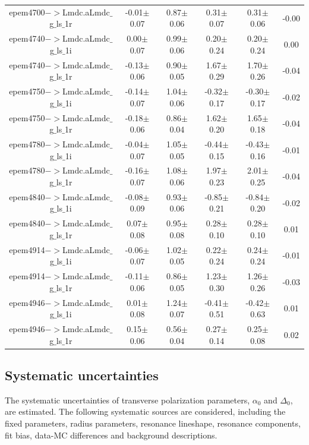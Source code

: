 \begin{table}[h]
{\begin{tabular}{cccccc}
        epem4700$->$Lmdc.aLmdc$\_$g$\_$ls$\_$1r & -0.01$\pm$0.07 & 0.87$\pm$0.06 & 0.31$\pm$0.07 & 0.31$\pm$0.06 & -0.00 \\
        epem4740$->$Lmdc.aLmdc$\_$g$\_$ls$\_$1i & 0.00$\pm$0.07 & 0.99$\pm$0.06 & 0.20$\pm$0.24 & 0.20$\pm$0.24 & 0.00 \\
        epem4740$->$Lmdc.aLmdc$\_$g$\_$ls$\_$1r & -0.13$\pm$0.06 & 0.90$\pm$0.05 & 1.67$\pm$0.29 & 1.70$\pm$0.26 & -0.04 \\
        epem4750$->$Lmdc.aLmdc$\_$g$\_$ls$\_$1i & -0.14$\pm$0.07 & 1.04$\pm$0.06 & -0.32$\pm$0.17 & -0.30$\pm$0.17 & -0.02 \\
        epem4750$->$Lmdc.aLmdc$\_$g$\_$ls$\_$1r & -0.18$\pm$0.06 & 0.86$\pm$0.04 & 1.62$\pm$0.20 & 1.65$\pm$0.18 & -0.04 \\
        epem4780$->$Lmdc.aLmdc$\_$g$\_$ls$\_$1i & -0.04$\pm$0.07 & 1.05$\pm$0.05 & -0.44$\pm$0.15 & -0.43$\pm$0.16 & -0.01 \\
        epem4780$->$Lmdc.aLmdc$\_$g$\_$ls$\_$1r & -0.16$\pm$0.07 & 1.08$\pm$0.06 & 1.97$\pm$0.23 & 2.01$\pm$0.25 & -0.04 \\
        epem4840$->$Lmdc.aLmdc$\_$g$\_$ls$\_$1i & -0.08$\pm$0.09 & 0.93$\pm$0.06 & -0.85$\pm$0.21 & -0.84$\pm$0.20 & -0.02 \\
        epem4840$->$Lmdc.aLmdc$\_$g$\_$ls$\_$1r & 0.07$\pm$0.08 & 0.95$\pm$0.08 & 0.28$\pm$0.10 & 0.28$\pm$0.10 & 0.01 \\
        epem4914$->$Lmdc.aLmdc$\_$g$\_$ls$\_$1i & -0.06$\pm$0.07 & 1.02$\pm$0.05 & 0.22$\pm$0.24 & 0.24$\pm$0.24 & -0.01 \\
        epem4914$->$Lmdc.aLmdc$\_$g$\_$ls$\_$1r & -0.11$\pm$0.06 & 0.86$\pm$0.05 & 1.23$\pm$0.30 & 1.26$\pm$0.26 & -0.03 \\
        epem4946$->$Lmdc.aLmdc$\_$g$\_$ls$\_$1i & 0.01$\pm$0.08 & 1.24$\pm$0.07 & -0.41$\pm$0.51 & -0.42$\pm$0.63 & 0.01 \\
        epem4946$->$Lmdc.aLmdc$\_$g$\_$ls$\_$1r & 0.15$\pm$0.06 & 0.56$\pm$0.04 & 0.27$\pm$0.14 & 0.25$\pm$0.08 & 0.02 \\
        \hline\hline
        \end{tabular}
        }
\end{table}

\clearpage
\subsection{Systematic uncertainties}
\label{sec:systmeatic}

The systematic uncertainties of transverse polarization parameters, $\alpha_0$ and $\Delta_0$, are estimated. The following systematic sources are considered, including the fixed parameters, radius parameters, resonance lineshape, resonance components, fit bias, data-MC differences and background descriptions.

